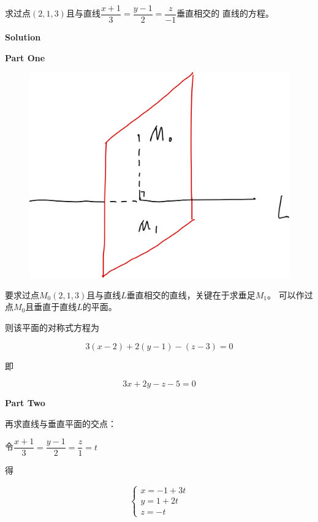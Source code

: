 \documentclass[
	11pt, %
	a4paper, %
]{WhuSakuraBook}
\begin{document}
    求过点\(\left(2,1,3\right)\)且与直线$\dfrac{x+1}{3}=\dfrac{y-1}{2}=\dfrac{z}{-1}$垂直相交的
    直线的方程。
    \vspace{1em}

    \textbf{Solution}
    \vspace{1em}

    \textbf{Part One}

    \begin{figure}
        \centering
        \includegraphics[scale=0.08]{"Chapter 08 images/pic1.png"}
        \label{pic1}
    \end{figure}

    要求过点\(M_{0}\left(2,1,3\right)\)且与直线$L$垂直相交的直线，关键在于求垂足\(M_1\)。
    可以作过点\(M_{0}\)且垂直于直线$L$的平面。

    则该平面的对称式方程为

    \[
        3(x-2)+2(y-1)-(z-3)=0
    \]

    即

    \[
        3x + 2y -z -5 =0
    \]

    \textbf{Part Two}

    再求直线与垂直平面的交点：

    令$\dfrac{x+1}{3}=\dfrac{y-1}{2}=\dfrac{z}{1}=t$

    得

    $$
        \left\{\begin{array}{l}
        x=-1+3 t \\
        y=1+2 t \\
        z=-t
        \end{array}\right.
    $$
\end{document}
